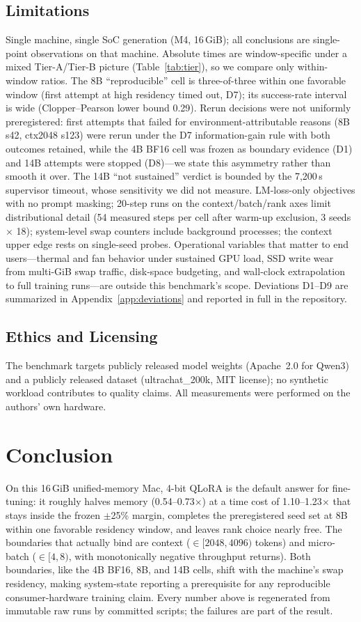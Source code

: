 \documentclass[10pt,twocolumn]{article}
\begin{document}
\subsection{Limitations}
Single machine, single SoC generation (M4, 16\,GiB); all conclusions
are single-point observations on that machine. Absolute times are
window-specific under a mixed Tier-A/Tier-B picture (Table~\ref{tab:tier}),
so we compare only within-window ratios. The 8B ``reproducible'' cell
is three-of-three within one favorable window (first attempt at high
residency timed out, D7); its success-rate interval is wide
(Clopper--Pearson lower bound 0.29). Rerun decisions were not
uniformly preregistered: first attempts that failed for
environment-attributable reasons (8B s42, ctx2048 s123) were rerun
under the D7 information-gain rule with both outcomes retained, while
the 4B BF16 cell was frozen as boundary evidence (D1) and 14B attempts
were stopped (D8)---we state this asymmetry rather than smooth it
over. The 14B ``not sustained'' verdict is bounded by the 7{,}200\,s
supervisor timeout, whose sensitivity we did not measure. LM-loss-only
objectives with no prompt masking; 20-step runs on the
context/batch/rank axes limit distributional detail (54 measured steps
per cell after warm-up exclusion, 3 seeds $\times$ 18); system-level swap counters include
background processes; the context upper edge rests on single-seed
probes. Operational variables that matter to end users---thermal and
fan behavior under sustained GPU load, SSD write wear from multi-GiB
swap traffic, disk-space budgeting, and wall-clock extrapolation to
full training runs---are outside this benchmark's scope. Deviations
D1--D9 are summarized in
Appendix~\ref{app:deviations} and reported in full in the repository.

\subsection{Ethics and Licensing}
The benchmark targets publicly released model weights (Apache~2.0 for Qwen3)
and a publicly released dataset (ultrachat\_200k, MIT license);
no synthetic workload contributes to quality claims. All measurements were
performed on the authors' own hardware.

\section{Conclusion}
On this 16\,GiB unified-memory Mac, 4-bit QLoRA is the default answer
for fine-tuning: it roughly halves memory (0.54--0.73$\times$) at a
time cost of 1.10--1.23$\times$ that stays inside the frozen $\pm$25\%
margin, completes the preregistered seed set at 8B within one
favorable residency window, and leaves rank choice nearly free. The
boundaries that actually bind are context ($\in[2048,4096)$ tokens)
and micro-batch ($\in[4,8)$, with monotonically negative throughput
returns). Both boundaries, like the 4B BF16, 8B, and 14B cells, shift
with the machine's swap residency, making system-state reporting a
prerequisite for any reproducible consumer-hardware training claim.
Every number above is regenerated from immutable raw runs by committed
scripts; the failures are part of the result.
\end{document}
